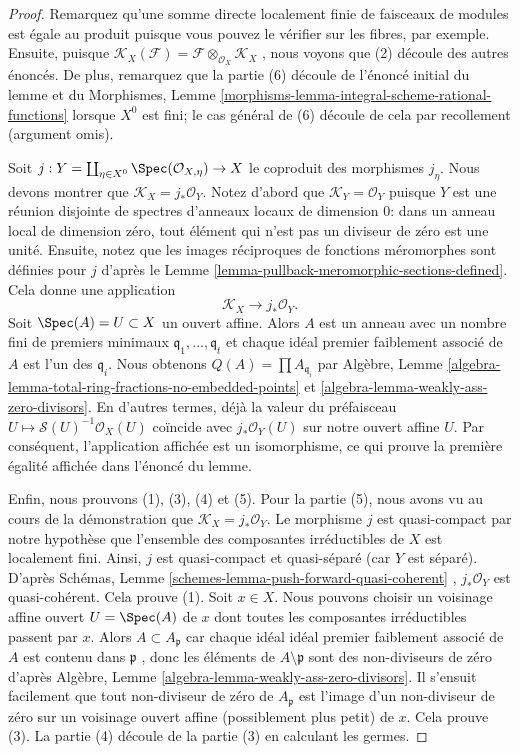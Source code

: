 \begin{proof}
Remarquez qu'une somme directe localement finie de faisceaux de modules est égale
au produit puisque vous pouvez le vérifier sur les fibres, par exemple. Ensuite,
puisque  $\mathcal{K}_X(\mathcal{F}) =
\mathcal{F} \otimes_{\mathcal{O}_X} \mathcal{K}_X$ , nous voyons que (2) découle des autres énoncés. De plus,
remarquez que la partie (6) découle de l'énoncé initial du lemme et du Morphismes,
Lemme  \ref{morphisms-lemma-integral-scheme-rational-functions}  lorsque  $X^0$  est fini; le cas général de (6) découle de
cela par recollement (argument omis).

\medskip\noindent
Soit  $j : Y = \coprod\nolimits_{\eta \in X^0} \Spec(\mathcal{O}_{X, \eta}) \to X$  le coproduit des morphismes  $j_\eta$. Nous devons montrer
que  $\mathcal{K}_X = j_*\mathcal{O}_Y$. Notez d'abord que  $\mathcal{K}_Y = \mathcal{O}_Y$  puisque  $Y$  est une
réunion disjointe de spectres d'anneaux locaux de dimension  $0$: dans un
anneau local de dimension zéro, tout élément qui n'est pas un diviseur de zéro est
une unité. Ensuite, notez que les images réciproques de fonctions méromorphes sont
définies pour  $j$  d'après le Lemme  \ref{lemma-pullback-meromorphic-sections-defined}. Cela donne une
application
$$
\mathcal{K}_X \longrightarrow j_*\mathcal{O}_Y.
$$
Soit  $\Spec(A) = U \subset X$  un ouvert affine. Alors  $A$  est un anneau avec un
nombre fini de premiers minimaux  $\mathfrak q_1, \ldots, \mathfrak q_t$  et chaque idéal premier faiblement
associé de  $A$  est l'un des  $\mathfrak q_i$. Nous obtenons  $Q(A) = \prod A_{\mathfrak q_i}$  par
Algèbre, Lemme  \ref{algebra-lemma-total-ring-fractions-no-embedded-points}  et  \ref{algebra-lemma-weakly-ass-zero-divisors}. En d'autres termes, déjà la valeur du
préfaisceau  $U \mapsto \mathcal{S}(U)^{-1}\mathcal{O}_X(U)$  coïncide avec  $j_*\mathcal{O}_Y(U)$  sur notre ouvert affine
 $U$. Par conséquent, l'application affichée est un isomorphisme, ce qui
prouve la première égalité affichée dans l'énoncé du lemme.

\medskip\noindent
Enfin, nous prouvons (1), (3), (4) et (5). Pour la partie (5), nous avons vu au
cours de la démonstration que  $\mathcal{K}_X = j_*\mathcal{O}_Y$. Le morphisme  $j$  est
quasi-compact par notre hypothèse que l'ensemble des composantes irréductibles de
 $X$  est localement fini. Ainsi,  $j$  est quasi-compact et
quasi-séparé (car  $Y$  est séparé). D'après Schémas, Lemme  \ref{schemes-lemma-push-forward-quasi-coherent} ,
 $j_*\mathcal{O}_Y$  est quasi-cohérent. Cela prouve (1). Soit  $x \in X$. Nous pouvons
choisir un voisinage affine ouvert  $U = \Spec(A)$  de  $x$  dont toutes les
composantes irréductibles passent par  $x$. Alors  $A \subset A_\mathfrak p$  car chaque
idéal idéal premier faiblement associé de  $A$  est contenu dans
 $\mathfrak p$ , donc les éléments de  $A \setminus \mathfrak p$  sont des non-diviseurs de zéro
d'après Algèbre, Lemme  \ref{algebra-lemma-weakly-ass-zero-divisors}. Il s'ensuit facilement que tout non-diviseur
de zéro de  $A_\mathfrak p$  est l'image d'un non-diviseur de zéro sur un voisinage
ouvert affine (possiblement plus petit) de  $x$. Cela prouve (3). La
partie (4) découle de la partie (3) en calculant les germes.
\end{proof}

